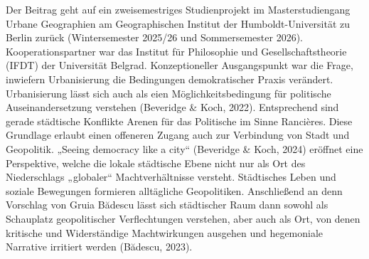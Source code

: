 \documentclass[
  ngerman,
]{agujournal2019}
\begin{document}
Der Beitrag geht auf ein zweisemestriges Studienprojekt im
Masterstudiengang Urbane Geographien am Geographischen Institut der
Humboldt-Universität zu Berlin zurück (Wintersemester 2025/26 und
Sommersemester 2026). Kooperationspartner war das Institut für
Philosophie und Gesellschaftstheorie (IFDT) der Universität Belgrad.
Konzeptioneller Ausgangspunkt war die Frage, inwiefern Urbanisierung die
Bedingungen demokratischer Praxis verändert. Urbanisierung lässt sich
auch als eien Möglichkeitsbedingung für politische Auseinandersetzung
verstehen (Beveridge \& Koch, 2022). Entsprechend sind gerade städtische
Konflikte Arenen für das Politische im Sinne Rancières. Diese Grundlage
erlaubt einen offeneren Zugang auch zur Verbindung von Stadt und
Geopolitik. „Seeing democracy like a city`` (Beveridge \& Koch, 2024)
eröffnet eine Perspektive, welche die lokale städtische Ebene nicht nur
als Ort des Niederschlags „globaler`` Machtverhältnisse versteht.
Städtisches Leben und soziale Bewegungen formieren alltägliche
Geopolitiken. Anschließend an denn Vorschlag von Gruia Bădescu lässt
sich städtischer Raum dann sowohl als Schauplatz geopolitischer
Verflechtungen verstehen, aber auch als Ort, von denen kritische und
Widerständige Machtwirkungen ausgehen und hegemoniale Narrative
irritiert werden (Bădescu, 2023).
\end{document}
